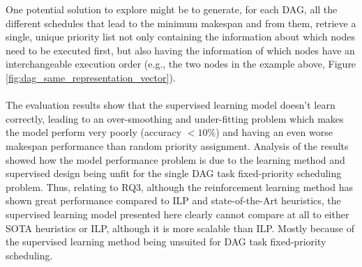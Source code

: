 One potential solution to explore might be to generate,
for each DAG, all the different schedules that lead to the minimum
makespan and from them, retrieve a single, unique priority list
not only containing the information about which nodes need to be
executed first, but also having the information of which nodes
have an interchangeable execution order 
(e.g., the two nodes in the example above, Figure \ref{fig:dag_same_representation_vector}).
\\\\

The evaluation results show that the supervised learning model
doesn't learn correctly, leading to an over-smoothing and under-fitting problem
which makes the model perform very poorly (accuracy $<10$\%)
and having an even worse makespan performance than random priority assignment.
Analysis of the results showed how the model performance problem
is due to the learning method and supervised design being unfit for
the single DAG task fixed-priority scheduling problem.
Thus, relating to RQ3, although the reinforcement learning
method has shown great performance compared to ILP\cite{Zhao2024GATDRLmodel}
and state-of-the-Art heuristics\cite{Lee2021GlobalDagSchedDRL},
the supervised learning model presented here 
clearly cannot compare at all to either SOTA heuristics
or ILP, although it is more scalable than ILP. 
Mostly because of the supervised learning method being unsuited 
for DAG task fixed-priority scheduling.